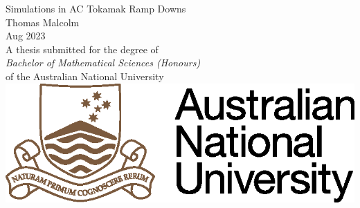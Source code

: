 \begin{titlepage}
\begin{center}

\vspace*{\fill} \Huge
                        Simulations in AC Tokamak Ramp Downs
\\
\vfill\vfill\Large
                          Thomas Malcolm
\\
\vfill\vfill
                          Aug 2023
\\
\vfill\vfill \normalsize
         A thesis submitted for the degree of \\
         \emph{Bachelor of Mathematical Sciences (Honours)} \\
         of the Australian National University
\vfill
         \includegraphics{ANU.eps}

\end{center}

\end{titlepage}
